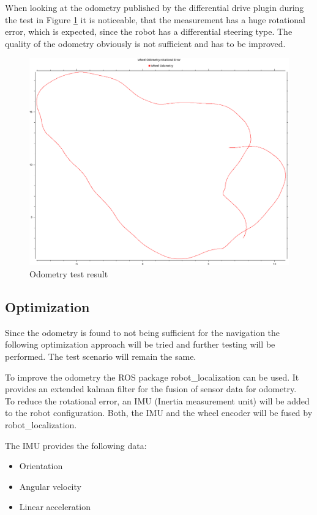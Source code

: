 When looking at the odometry published by the differential drive plugin during the test in Figure \ref{wheel odom} it is noticeable, that the measurement has a huge rotational error, which is expected, since the robot has a differential steering type.
The quality of the odometry obviously is not sufficient and has to be improved.
\begin{figure}[H]
	\includegraphics[width=\textwidth]{Pictures/rot error}
	\caption{Odometry test result}
	\label{wheel odom}

\end{figure}


\subsection{Optimization}
Since the odometry is found to not being sufficient for the navigation the following optimization approach will be tried and further testing will be performed. The test scenario will remain the same.

To improve the odometry the ROS package robot\_localization can be used. It provides an extended kalman filter for the fusion of sensor data for odometry.\\

To reduce the rotational error, an IMU (Inertia measurement unit) will be added to the robot configuration. Both, the IMU and the wheel encoder will be fused by robot\_localization.

The IMU provides the following data:
\begin{itemize}
	\item Orientation
	\item Angular velocity
	\item Linear acceleration
\end{itemize}

